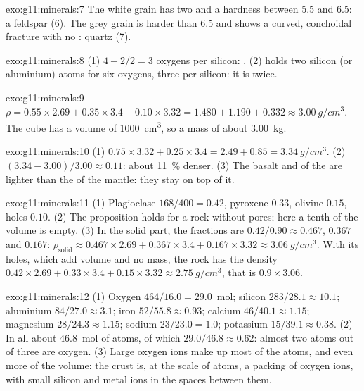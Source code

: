 \begin{solution}{exo:g11:minerals:7}
The white grain has two  and a hardness between 5.5 and 6.5: a
feldspar (6). The grey grain is harder than 6.5 and shows a curved,
conchoidal fracture with no : quartz (7).
\end{solution}

\begin{solution}{exo:g11:minerals:8}
(1) $4 - 2/2 = 3$ oxygens per silicon: . (2)  holds
two silicon (or aluminium) atoms for six oxygens, three per silicon: it is
 twice.
\end{solution}

\begin{solution}{exo:g11:minerals:9}
$\rho = 0.55 \times 2.69 + 0.35 \times 3.4 + 0.10 \times 3.32 = 1.480 + 1.190
+ 0.332 \approx \qty{3.00}{g/cm^3}$. The cube has a volume of
\qty{1000}{cm^3}, so a mass of about \qty{3.00}{kg}.
\end{solution}

\begin{solution}{exo:g11:minerals:10}
(1) $0.75 \times 3.32 + 0.25 \times 3.4 = 2.49 + 0.85 = \qty{3.34}{g/cm^3}$.
(2) $(3.34 - 3.00)/3.00 \approx 0.11$: about \qty{11}{\percent} denser.
(3) The basalt and  of the  are lighter than the
 of the mantle: they stay on top of it.
\end{solution}

\begin{solution}{exo:g11:minerals:11}
(1) Plagioclase $168/400 = 0.42$, pyroxene $0.33$, olivine $0.15$, holes
$0.10$. (2) The proposition holds for a rock without pores; here a tenth of
the volume is empty. (3) In the solid part, the fractions are $0.42/0.90
\approx 0.467$, $0.367$ and $0.167$:
$\rho_{\text{solid}} \approx 0.467 \times 2.69 + 0.367 \times 3.4 + 0.167
\times 3.32 \approx \qty{3.06}{g/cm^3}$. With its holes, which add volume
and no mass, the rock has the density $0.42 \times 2.69 + 0.33 \times 3.4 +
0.15 \times 3.32 \approx \qty{2.75}{g/cm^3}$, that is $0.9 \times 3.06$.
\end{solution}

\begin{solution}{exo:g11:minerals:12}
(1) Oxygen $464/16.0 = 29.0$~mol; silicon $283/28.1 \approx 10.1$; aluminium
$84/27.0 \approx 3.1$; iron $52/55.8 \approx 0.93$; calcium $46/40.1 \approx
1.15$; magnesium $28/24.3 \approx 1.15$; sodium $23/23.0 = 1.0$; potassium
$15/39.1 \approx 0.38$. (2) In all about $46.8$~mol of atoms, of which
$29.0/46.8 \approx 0.62$: almost two atoms out of three are oxygen.
(3) Large oxygen ions make up most of the atoms, and even more of the
volume: the crust is, at the scale of atoms, a packing of oxygen ions, with
small silicon and metal ions in the spaces between them.
\end{solution}

